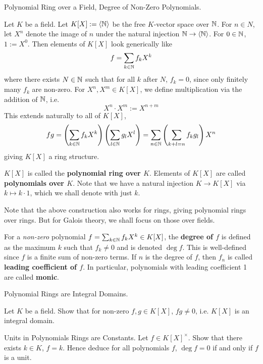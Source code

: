 \documentclass[../book.tex]{subfiles}
\begin{document}
\begin{dfn} Polynomial Ring over a Field, Degree of Non-Zero Polynomials. 

    Let $K$ be a field. 
    Let $K[X] := \langle\mathbb{N}\rangle$ be the free $K$-vector space over $\mathbb{N}$. 
    For $n \in N$, let $X^n$ denote the image of $n$ 
    under the natural injection $\mathbb{N} \to \langle\mathbb{N}\rangle$. 
    For $0 \in \mathbb{N}$, $1 := X^0$. 
    Then elements of $K[X]$ look generically like \[
        f = \sum_{k \in \mathbb{N}} f_k X^k
    \]
    where there exists $N \in \mathbb{N}$ such that for all $k$ after $N$, $f_k = 0$,
    since only finitely many $f_k$ are non-zero. 
    For $X^n, X^m \in K[X]$, we define multiplication via the addition of $\mathbb{N}$,
    i.e. \[X^n \cdot X^m := X^{n + m}\]
    This extends naturally to all of $K[X]$, \[
    fg = \left(\sum_{k \in \mathbb{N}} f_k X^k\right)\left(\sum_{l \in \mathbb{N}} g_l X^l\right) 
    = \sum_{n \in \mathbb{N}} \left(\sum_{k + l = n} f_k g_l\right) X^n
    \]
    giving $K[X]$ a ring structure.
    
    $K[X]$ is called the \textbf{polynomial ring over $K$}.
    Elements of $K[X]$ are called \textbf{polynomials over $K$}. 
    Note that we have a natural injection $K \to K[X]$ via $k \mapsto k\cdot 1$,
    which we shall denote with just $k$. 
    
    Note that the above construction also works for rings, 
    giving polynomial rings over rings.
    But for Galois theory, we shall focus on those over fields. 
    
    For a \emph{non-zero} polynomial $f = \sum_{k \in \mathbb{N}} f_k X^k\in K[X]$, 
    the \textbf{degree of $f$} is defined as 
    the maximum $k$ such that $f_k \neq 0$ and is denoted $\deg f$. 
    This is well-defined since $f$ is a finite sum of non-zero terms. 
    If $n$ is the degree of $f$, then $f_n$ is called 
    \textbf{leading coefficient of $f$}. 
    In particular, polynomials with leading coefficient 1 are called \textbf{monic}.
\end{dfn}

\begin{ex} [Important] Polynomial Rings are Integral Domains. 
    
    Let $K$ be a field. 
    Show that for non-zero $f, g \in K[X]$, $fg \neq 0$,
    i.e. $K[X]$ is an integral domain. 
\end{ex}

\begin{ex} Units in Polynomials Rings are Constants.
    Let $f \in K[X]^\times$. Show that there exists $k \in K$, $f = k$. 
    Hence deduce for all polynomials $f$, $\deg f = 0$ if and only if $f$ is a unit.
\end{ex}
\end{document}
